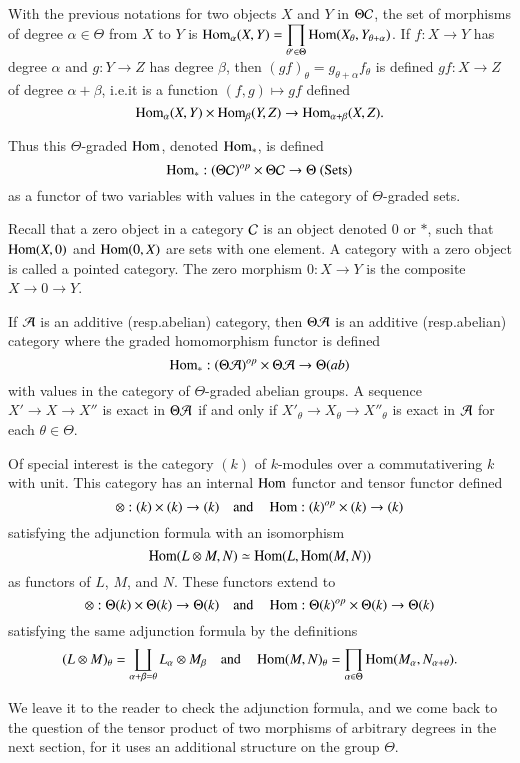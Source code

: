 \begin{definition}\label{chap1-defi1.2}
With the previous notations for two objects $X$ and $Y$ in $\Theta\mathcal{C}$,
the set of morphisms of degree $\alpha\in\Theta$ from $X$ to $Y$ is
$\operatorname{Hom}_{\alpha}(X,Y)=\displaystyle{\prod_{\theta'\in\Theta}}\operatorname{Hom}(X_{\theta},Y_{\theta+\alpha})$. If
$f:X\to Y$ has degree $\alpha$ and $g:Y\to Z$ has degree $\beta$, then
$(gf)_{\theta}=g_{\theta+\alpha}f_{\theta}$ is defined $gf:X\to Z$ of
degree $\alpha+\beta$, i.e.\@ it is a function $(f,g)\mapsto gf$
defined
$$
\operatorname{Hom}_{\alpha}(X,Y)\times \operatorname{Hom}_{\beta}(Y,Z)\to
\operatorname{Hom}_{\alpha+\beta}(X,Z).
$$
\end{definition}

Thus this $\Theta$-graded $\operatorname{Hom}$, denoted $\operatorname{Hom}_{*}$, is defined
$$
\operatorname{Hom}_{*}:(\Theta\mathcal{C})^{op}\times \Theta\mathcal{C}\to \Theta~\text{(Sets)}
$$
as a functor of two variables with values in the category of
$\Theta$-graded sets.

\begin{remark}\label{chap1-rem1.3}
Recall that a zero object in a category $\mathcal{C}$ is an object denoted $0$
or $*$, such that $\operatorname{Hom}(X,0)$ and $\operatorname{Hom}(0,X)$ are sets with one
element. A category with a zero object is called a pointed
category. The zero morphism $0:X\to Y$ is the composite $X\to 0\to Y$.
\end{remark}

\begin{remark}\label{chap1-rem1.4}
If $\mathcal{A}$ is an additive (resp.\@ abelian) category, then $\Theta\mathcal{A}$ is
an additive (resp.\@ abelian) category where the graded homomorphism
functor is defined
$$
\operatorname{Hom}_{*}:(\Theta\mathcal{A})^{op}\times \Theta\mathcal{A}\to \Theta(ab)
$$
with values in the category of $\Theta$-graded abelian
groups. A
sequence $X'\to X\to X''$ is exact in $\Theta\mathcal{A}$ if and only if
$X'_{\theta}\to X_{\theta}\to X''_{\theta}$ is exact in $\mathcal{A}$ for each
$\theta\in\Theta$. 
\end{remark}

\begin{remark}\label{chap1-rem1.5}
Of special interest is the category $(k)$ of $k$-modules over a
commutative\pageoriginale ring $k$ with unit. This category has an
internal $\operatorname{Hom}$ functor and tensor functor defined
$$
\otimes :(k)\times (k)\to (k)\quad\text{and}\quad \operatorname{Hom}:(k)^{op}\times (k)\to (k)
$$
satisfying the adjunction formula with an isomorphism
$$
\operatorname{Hom}(L\otimes M, N)\simeq \operatorname{Hom}(L,\operatorname{Hom}(M,N))
$$
as functors of $L$, $M$, and $N$. These functors extend to
$$
\otimes :\Theta(k)\times \Theta(k)\to \Theta(k)\quad\text{and}\quad
\operatorname{Hom}:\Theta(k)^{op}\times\Theta(k)\to \Theta(k)
$$
satisfying the same adjunction formula by the definitions
$$
(L\otimes
M)_{\theta}=\coprod\limits_{\alpha+\beta=\theta}L_{\alpha}\otimes
M_{\beta}\quad\text{and}\quad
\operatorname{Hom}(M,N)_{\theta}=\prod\limits_{\alpha\in\Theta}\operatorname{Hom}(M_{\alpha},N_{\alpha+\theta}). 
$$

We leave it to the reader to check the adjunction formula, and we come
back to the question of the tensor product of two morphisms of
arbitrary degrees in the next section, for it uses an additional
structure on the group $\Theta$.
\end{remark}

